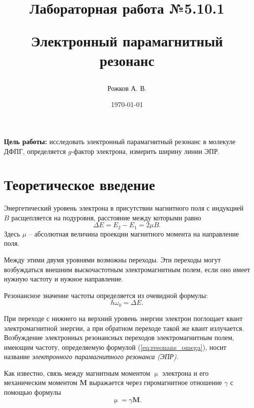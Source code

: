 \documentclass[a4paper, 12pt]{article}
\title{\begin{center}Лабораторная работа №5.10.1\end{center}
Электронный парамагнитный резонанс}
\author{Рожков А. В.}
\date{\today}
\begin{document}
    \maketitle
    \newpage
    \renewcommand*{\thesubsection}{\thesection.\Alph{subsection}}

    \textbf{Цель работы:} исследовать электронный парамагнитный резонанс в молекуле
ДФПГ, определяется $g$-фактор электрона, измерить ширину линии ЭПР.

    \section{Теоретическое введение}

        Энергетический уровень электрона в присутствии магнитного поля с индукцией $B$ расщепляется на подуровня, расстояние между которыми равно
        \begin{equation}
            \label{eq:dE}
            \Delta E = E_2 - E_1 = 2\mu B.
        \end{equation}
        Здесь $\mu$ -- абсолютная величина проекции магнитного момента на направление поля.

        Между этими двумя уровнями возможны переходы. Эти переходы могут возбуждаться внешним выскочастотным электромагнитным полем, если оно имеет нужную частоту и нужное направление.

        Резонансное значение частоты определяется из очевидной формулы:
        \begin{equation}
            \label{eq:resonans_omega}
            \hbar \omega_0 = \Delta E.
        \end{equation}

        При переходе с нижнего на верхний уровень энергии электрон поглощает квант электромагнитной энергии, а при обратном переходе такой же квант излучается.
        Возбуждение электронных резонансных переходов электромагнитным полем, имеющим частоту, определяемую формулой (\ref{eq:resonans_omega}),
        носит название \textit{электронного парамагнитного резонанса (ЭПР)}.

        Как известно, связь между магнитным моментом $\upmu$ электрона и его механическим моментом $\mathbf{M}$ выражается через гиромагнитное отношение $\gamma$ с помощью формулы
        \begin{equation}
            \label{eq:gyromagnit}
            \upmu = \gamma \mathbf{M}.
        \end{equation}
\end{document}
